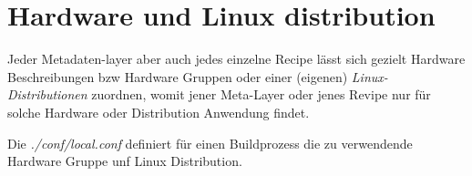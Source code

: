 \section{Hardware und Linux distribution}%
\label{sec:hardware_und_linux_distribution}

Jeder Metadaten-layer aber auch jedes einzelne Recipe lässt sich gezielt
Hardware Beschreibungen bzw Hardware Gruppen oder einer (eigenen)
\textit{Linux-\gls{Distributionen}} zuordnen, womit jener Meta-Layer oder jenes
Revipe nur für solche Hardware oder Distribution Anwendung findet.

Die \textit{./conf/local.conf} definiert für einen Buildprozess die zu
verwendende Hardware Gruppe unf Linux Distribution.
